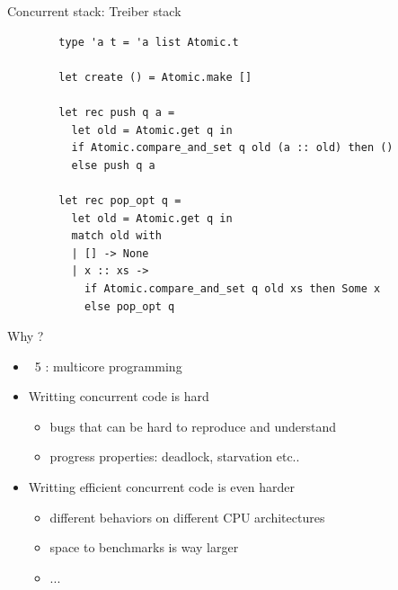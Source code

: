 \begin{frame}[fragile]{Concurrent stack: Treiber stack}     
    \begin{lstlisting}
        type 'a t = 'a list Atomic.t

        let create () = Atomic.make []
      
        let rec push q a =
          let old = Atomic.get q in
          if Atomic.compare_and_set q old (a :: old) then ()
          else push q a
      
        let rec pop_opt q =
          let old = Atomic.get q in
          match old with
          | [] -> None
          | x :: xs -> 
            if Atomic.compare_and_set q old xs then Some x 
            else pop_opt q
    \end{lstlisting}
\end{frame}

\begin{frame}{Why \Saturn ?}
    \begin{itemize}[label=$\bullet$]
        \item \OCaml~5 : multicore programming
        \item Writting concurrent code is hard 
            \begin{itemize}[label=$\diamond$]
                \item bugs that can be hard to reproduce and understand
                \item progress properties: deadlock, starvation etc..
            \end{itemize}  
        \item Writting efficient concurrent code is even harder
        \begin{itemize}[label=$\diamond$]
            \item different behaviors on different CPU architectures
            \item space to benchmarks is way larger
            \item ... 
        \end{itemize}
    \end{itemize}
\end{frame}

